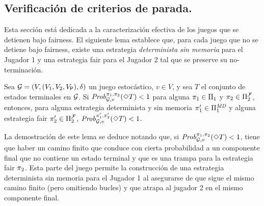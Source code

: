 \subsection{Verificación de criterios de parada.}

Esta sección está dedicada a la
caracterización efectiva de los juegos que se detienen bajo fairness.
El siguiente lema establece que, para cada juego que no se detiene bajo
fairness, existe una estrategia \emph{determinista sin memoria} para el Jugador 1 y una estrategia fair para el Jugador 2 tal que se preserve su no-terminación.


\begin{lemma}\label{lm:memoryless-strat}
  Sea $\mathcal{G} = (V, (V_1, V_2, V_{\mathsf{P}}), \delta)$ un juego estocástico, $v \in V$, y sea $T$ el conjunto de estados terminales en $\mathcal{G}$.
  Si $\mathit{Prob}^{\pi_{1}, \pi_{2}}_{\mathcal{G}, v}(\Diamond T) < 1$
  para alguna
  $\pi_{1} \in \Pi_{1}$ y $\pi_{2} \in \Pi^{\mathcal{F}}_{2}$,
  entonces, para alguna estrategia determinista y sin memoria
  $\pi_{1}' \in \Pi^{\textit{MD}}_{1}$ y alguna estrategia fair
  $\pi_{2}' \in \Pi^{\mathcal{F}}_{2}$,
  $\mathit{Prob}^{\pi_{1}', \pi_{2}'}_{\mathcal{G}, v}(\Diamond T) < 1$.
\end{lemma}

La demostración de este lema se deduce notando que, si $\mathit{Prob}^{\pi_{1}, \pi_{2}}_{\mathcal{G}, v}(\Diamond T) < 1$, tiene que haber un camino finito que conduce con cierta probabilidad a un componente final que no contiene un estado terminal y que es una trampa para la estrategia fair $\pi_{2}$. Esta parte del juego permite la construcción de una estrategia determinista sin memoria para el Jugador 1 al asegurarse de que sigue el mismo camino finito (pero omitiendo bucles) y que atrapa al jugador 2 en el mismo componente final.

